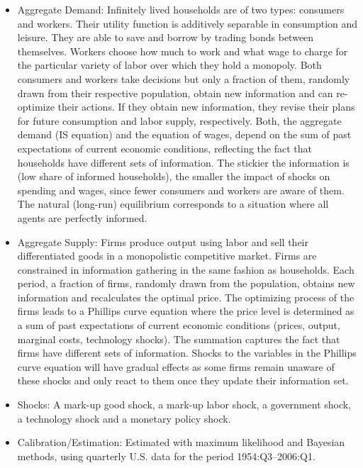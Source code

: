 \documentclass[11pt,a4paper]{article}
\begin{document}
	\begin{itemize}
		
		\item Aggregate Demand: Infinitely lived households are of two types: consumers and workers. Their utility function is additively separable in consumption and leisure. They are able to save and borrow by trading bonds between themselves. Workers choose how much to work and what wage to charge for the particular variety of labor over which they hold a monopoly. Both consumers and workers take decisions but only a fraction of them, randomly drawn from their respective population, obtain new information and can re-optimize their actions. If they obtain new information, they revise their plans for future consumption and labor supply, respectively. Both, the aggregate demand (IS equation) and the equation of wages, depend on the sum of past expectations of current economic conditions, reflecting the fact that households have different sets of information. The stickier the information is (low share of informed households), the smaller the impact of shocks on spending and wages, since fewer consumers and workers are aware of them. The natural (long-run) equilibrium corresponds to a situation where all agents are perfectly informed.
		
		\item Aggregate Supply: Firms produce output using labor and sell their differentiated goods in a monopolistic competitive market. Firms are constrained in information gathering in the same fashion as households. Each period, a fraction of firms, randomly drawn from the population, obtains new information and recalculates the optimal price. The optimizing process of the firms leads to a Phillips curve equation where the price level is determined as a sum of past expectations of current economic conditions (prices, output, marginal costs, technology shocks). The summation captures the fact that firms have different sets of information. Shocks to the variables in the Phillips curve equation will have gradual effects as some firms remain unaware of these shocks and only react to them once they update their information set.
		
		\item Shocks: A mark-up good shock, a mark-up labor shock, a government shock, a technology shock and a monetary policy shock.
		
		\item Calibration/Estimation: Estimated with maximum likelihood and Bayesian methods, using quarterly U.S. data for the period 1954:Q3--2006:Q1.
		
		
	\end{itemize}
	
\end{document}
